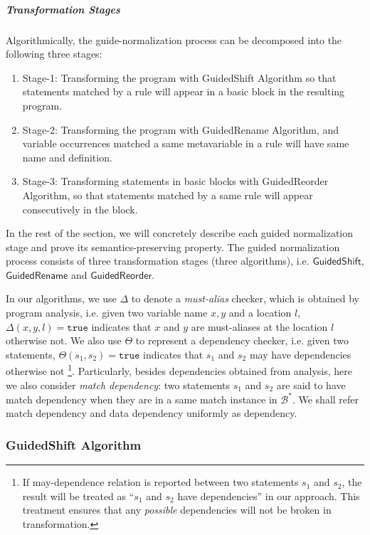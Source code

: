 \documentclass[a4paper, USenglish]{lipics-v2016}
\theoremstyle{plain}
\begin{document}
\subparagraph*{Transformation Stages} Algorithmically, the guide-normalization process can be decomposed into the following three stages:
\begin{enumerate}\itemsep0pt
\item Stage-1: Transforming the program with \textsf{GuidedShift Algorithm} so that statements matched by a rule will appear in a basic block in the resulting program.
\item Stage-2: Transforming the program with \textsf{GuidedRename Algorithm}, and variable occurrences matched a same metavariable in a rule will have same name and definition.
\item Stage-3: Transforming statements in basic blocks with \textsf{GuidedReorder Algorithm}, so that statements matched by a same rule will appear consecutively in the block. 
\end{enumerate}

In the rest of the section, we will concretely describe each guided normalization stage and prove its semantics-preserving property. The guided normalization process consists of three transformation stages (three algorithms), i.e. $\mathsf{GuidedShift}$, $\mathsf{GuidedRename}$ and $\mathsf{GuidedReorder}$.

In our algorithms, we use $\Delta$ to denote a \emph{must-alias}
checker, which is obtained by program analysis, i.e. given two variable name $x,y$ and a location $l$,
$\Delta(x,y,l)=\mathtt{true}$ indicates that $x$ and $y$ are
must-aliases at the location $l$ otherwise not. We also use $\Theta$
to represent a dependency checker, i.e. given two statements,
$\Theta(s_1, s_2)=\mathtt{true}$ indicates that $s_1$ and $s_2$ may have
dependencies otherwise not \footnote{If may-dependence relation is reported between two statements $s_1$ and $s_2$, the result will be treated as ``$s_1$ and $s_2$ have dependencies'' in our approach. This treatment ensures that any \textit{possible} dependencies will not be broken in transformation.}. Particularly, besides dependencies obtained from analysis,
here we also consider \emph{match dependency}: two statements $s_1$ and $s_2$
are said to have match dependency when they are in a same match
instance in $\mathcal{B}^*$. We shall refer match dependency and data
dependency uniformly as dependency.

\subsubsection{GuidedShift Algorithm}
\end{document}
